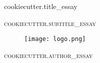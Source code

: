 \begin{titlepage}

  \begin{center}


    {
      \fontsize{60pt}{70pt}\selectfont
      \textcolor{titlecolor}
        {
          {{cookiecutter.title_essay}}
	}
	\\[2cm]
    }

    \textsc{\huge
	  {{cookiecutter.subtitle_essay}}
    }
    \\[4cm]

    \begin{figure}[h]
      \centering
      \texttt{[image: logo.png]}
    \end{figure}

    \vspace{1.5cm}

    \textsc{\Large
      {{cookiecutter.author_essay}}
    }

  \end{center}
\end{titlepage}
